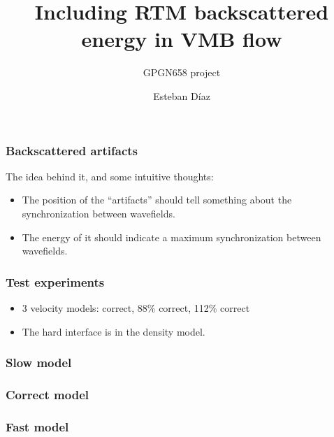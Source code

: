 

\title[]{Including RTM backscattered energy in VMB flow}
\subtitle{GPGN658 project }
\author[]{Esteban  D\'{i}az}
\date{}
\logo{}

\def\big#1{\begin{center} \LARGE \textbf{#1} \end{center}}
\def\cen#1{\begin{center}        \textbf{#1} \end{center}}

 { \cwpcover }

\begin{frame} \frametitle{Backscattered artifacts}
The idea behind it, and some intuitive thoughts:

\begin{itemize}
   \item The position of the ``artifacts'' should tell 
   something about the synchronization between wavefields.
   \item The energy of it should indicate a maximum synchronization 
   between wavefields.
\end{itemize}

\end{frame}
\cwpnote{}

\begin{frame} \frametitle{Test experiments}

\begin{itemize}
   \item 3 velocity models: correct, 88\% correct, 112\% correct
   \item The hard interface is in the density model. 
\end{itemize}

\end{frame}
\cwpnote{}

\begin{frame} \frametitle{Slow    model}  \end{frame}
\begin{frame} \frametitle{Correct model}  \end{frame}
\begin{frame} \frametitle{Fast    model}  \end{frame}

